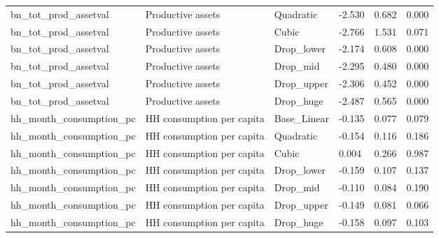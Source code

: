 \begin{tabular}{llllll}
bn\_tot\_prod\_assetval & Productive assets & Quadratic & -2.530 & 0.682 & 0.000 \\
bn\_tot\_prod\_assetval & Productive assets & Cubic & -2.766 & 1.531 & 0.071 \\
bn\_tot\_prod\_assetval & Productive assets & Drop\_lower & -2.174 & 0.608 & 0.000 \\
bn\_tot\_prod\_assetval & Productive assets & Drop\_mid & -2.295 & 0.480 & 0.000 \\
bn\_tot\_prod\_assetval & Productive assets & Drop\_upper & -2.306 & 0.452 & 0.000 \\
bn\_tot\_prod\_assetval & Productive assets & Drop\_huge & -2.487 & 0.565 & 0.000 \\
hh\_month\_consumption\_pc & HH consumption per capita & Base\_Linear & -0.135 & 0.077 & 0.079 \\
hh\_month\_consumption\_pc & HH consumption per capita & Quadratic & -0.154 & 0.116 & 0.186 \\
hh\_month\_consumption\_pc & HH consumption per capita & Cubic & 0.004 & 0.266 & 0.987 \\
hh\_month\_consumption\_pc & HH consumption per capita & Drop\_lower & -0.159 & 0.107 & 0.137 \\
hh\_month\_consumption\_pc & HH consumption per capita & Drop\_mid & -0.110 & 0.084 & 0.190 \\
hh\_month\_consumption\_pc & HH consumption per capita & Drop\_upper & -0.149 & 0.081 & 0.066 \\
hh\_month\_consumption\_pc & HH consumption per capita & Drop\_huge & -0.158 & 0.097 & 0.103 \\
\bottomrule
\end{tabular}
